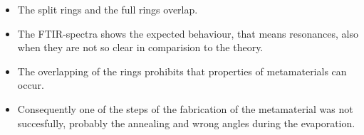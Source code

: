 \begin{itemize}

\item{The split rings and the full rings overlap.} 
\item{The FTIR-spectra shows the expected behaviour, that means resonances, also when they are not so clear in comparision to the theory.}
\item{The overlapping of the rings prohibits that properties of metamaterials can occur.}
\item{Consequently one of the steps of the fabrication of the metamaterial was not succesfully, probably the annealing and wrong angles during the evaporation.}
\end{itemize}  
